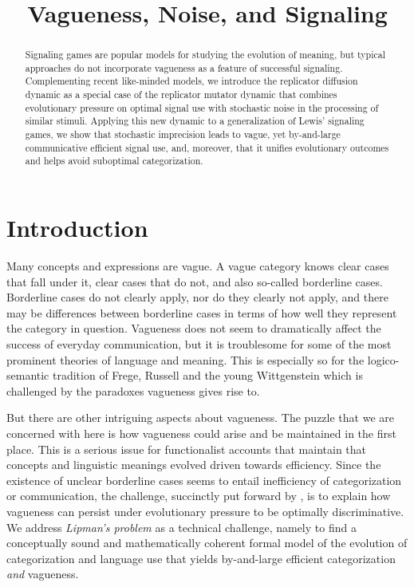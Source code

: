 \documentclass[fleqn,reqno,10pt]{article}
\title{Vagueness, Noise, and Signaling}
\date{}
\begin{document}
\maketitle

\begin{abstract}
  Signaling games are popular models for studying the evolution of
  meaning, but typical approaches do not incorporate vagueness as a
  feature of successful signaling.  Complementing recent like-minded
  models, we introduce the replicator diffusion dynamic as a special
  case of the replicator mutator dynamic that combines evolutionary
  pressure on optimal signal use with stochastic noise in the
  processing of similar stimuli. Applying this new dynamic to a
  generalization of Lewis' signaling games, we show that stochastic
  imprecision leads to vague, yet by-and-large communicative efficient
  signal use, and, moreover, that it unifies evolutionary outcomes and helps
  avoid suboptimal categorization.
\end{abstract}

\section{Introduction}
\label{sec:introduction}

Many concepts and expressions are vague. A vague category knows clear
cases that fall under it, clear cases that do not, and also so-called
borderline cases. Borderline cases do not clearly apply, nor do they
clearly not apply, and there may be differences between borderline
cases in terms of how well they represent the category in
question. Vagueness does not seem to dramatically affect the success
of everyday communication, but it is troublesome for some of the most
prominent theories of language and meaning. This is especially so for the logico-semantic tradition of Frege, Russell and the young
Wittgenstein which is challenged by the paradoxes vagueness gives rise
to. 

But there are other intriguing aspects about vagueness. The puzzle
that we are concerned with here is how vagueness could arise and be
maintained in the first place. This is a serious issue for
functionalist accounts that maintain that concepts and linguistic
meanings evolved driven towards efficiency. Since the existence of
unclear borderline cases seems to entail inefficiency of
categorization or communication, the challenge, succinctly put forward
by \citet{Lipman2009:Why-is-Language}, is to explain how vagueness can
persist under evolutionary pressure to be optimally discriminative. We
address \emph{Lipman's problem} as a technical challenge, namely to
find a conceptually sound and mathematically coherent formal model of
the evolution of categorization and language use that yields
by-and-large efficient categorization \emph{and} vagueness.
\end{document}
